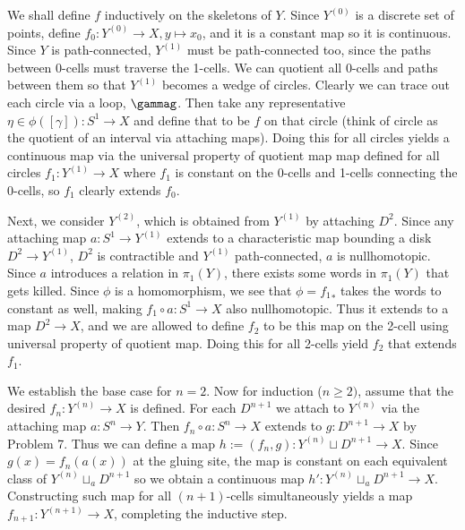 \documentclass[12pt]{article}
\begin{document}
\begin{problem}[8]
	We shall define $ f$ inductively on the skeletons of  $ Y$. Since  $ Y^{(0)}$ is a discrete set of points, define $ f_0 : Y^{(0)} \to X, y \mapsto x_0$, and it is a constant map so it is continuous. Since $ Y$ is path-connected,  $ Y^{(1)}$ must be path-connected too, since the paths between 0-cells must traverse the 1-cells. We can quotient all 0-cells and paths between them so that $ Y^{(1)}$ becomes a wedge of circles. Clearly we can trace out each circle via a loop, $ \gammag$. Then take any representative $ \eta \in \phi([ \gamma]): S^{1} \to X$ and define that to be $ f$ on that circle (think of circle as the quotient of an interval via attaching maps). Doing this for all circles yields a continuous map via the universal property of quotient map map defined for all circles $ f_1: Y^{(1)} \to X$ where $ f_1$ is constant on the 0-cells and 1-cells connecting the 0-cells, so $ f_1$ clearly extends $ f_0$.

	Next, we consider $ Y^{(2)}$, which is obtained from $ Y^{(1)}$ by attaching $ D^2$. Since any attaching map $ a: S^{1} \to Y^{(1)}$ extends to a characteristic map bounding a disk $ D^2 \to Y^{(1)}$, $ D^2$ is contractible and $ Y^{(1)}$ path-connected, $ a$ is nullhomotopic. Since $ a$ introduces a relation in  $ \pi_1( Y) $, there exists some words in $ \pi_1( Y) $ that gets killed. Since $ \phi$ is a homomorphism, we see that $ \phi={f_1}_*$ takes the words to constant as well, making $ f_1 \circ a: S^{1} \to X$ also nullhomotopic. Thus it extends to a map  $ D^2 \to X$, and we are allowed to define $ f_2$ to be this map on the 2-cell using universal property of quotient map. Doing this for all 2-cells yield $ f_2$ that extends $ f_1$. 

	We establish the base case for $ n=2$. Now for induction ($ n\geq 2)$, assume that the desired $ f_n: Y^{(n)} \to X$ is defined. For each $ D^{n+1}$ we attach to $ Y^{(n)}$ via the attaching map $ a: S^{n} \to Y$. Then $ f_n \circ a: S^{n} \to X$ extends to $ g: D^{n+1} \to X$ by Problem 7. Thus we can define a map $ h:=(f_n,g): Y^{(n)} \sqcup D^{n+1} \to X$. Since $ g(x) = f_n(a(x))$ at the gluing site, the map is constant on each equivalent class of $ Y^{(n)} \sqcup_{a} D^{n+1}$ so we obtain a continuous map $ h':Y^{(n)} \sqcup_a D^{n+1} \to X$. Constructing such map for all $ (n+1)$-cells simultaneously yields a map  $ f_{n+1}: Y^{(n+1)} \to X$, completing the inductive step.
\end{problem}
\end{document}
